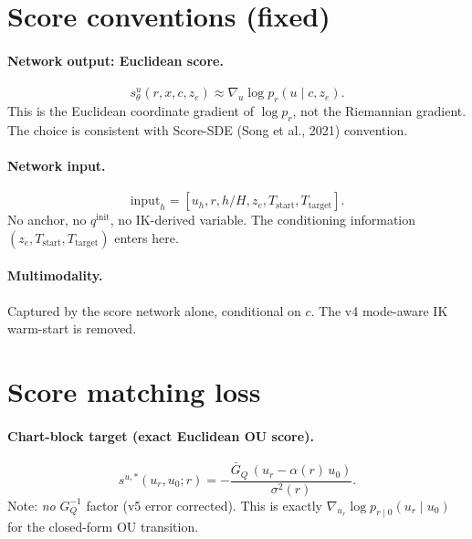 \documentclass[11pt,a4paper]{article}
\newcommand{\GQ}{G_Q}
\newcommand{\GQbar}{\bar G_Q}
\begin{document}
\section{Score conventions (fixed)}
\label{sec:score-conventions}

\paragraph{Network output: Euclidean score.}
\begin{equation}
\boxed{ s_\theta^u(r, x, c, z_e) \approx \nabla_u \log p_r(u \mid c, z_e). }
\end{equation}
This is the Euclidean coordinate gradient of $\log p_r$, not the Riemannian gradient. The choice is consistent with Score-SDE (Song et al., 2021) convention.

\paragraph{Network input.}
\begin{equation}
\text{input}_h = [u_h, r, h/H, z_e, T_\text{start}, T_\text{target}].
\end{equation}
No anchor, no $q^\text{init}$, no IK-derived variable. The conditioning information $(z_e, T_\text{start}, T_\text{target})$ enters here.

\paragraph{Multimodality.} Captured by the score network alone, conditional on $c$. The v4 mode-aware IK warm-start is removed.

\section{Score matching loss}
\label{sec:loss}

\paragraph{Chart-block target (exact Euclidean OU score).}
\begin{equation}
\boxed{ s^{u, *}(u_r, u_0; r) = -\frac{\GQbar\, (u_r - \alpha(r)\, u_0)}{\sigma^2(r)}. }
\end{equation}
Note: \emph{no} $\GQ^{-1}$ factor (v5 error corrected). This is exactly $\nabla_{u_r} \log p_{r \mid 0}(u_r \mid u_0)$ for the closed-form OU transition.
\end{document}
